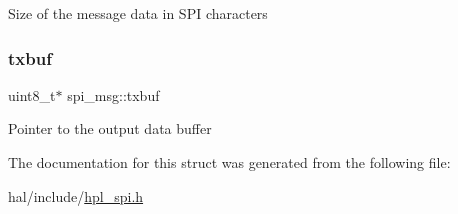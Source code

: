 Size of the message data in S\+PI characters \mbox{\label{structspi__msg_a250cdea72eff03e07bdecad08a62520d}} 
\subsubsection{\texorpdfstring{txbuf}{txbuf}}
{\footnotesize\ttfamily uint8\+\_\+t$\ast$ spi\+\_\+msg\+::txbuf}

Pointer to the output data buffer 

The documentation for this struct was generated from the following file\+:\begin{DoxyCompactItemize}
\item 
hal/include/\hyperlink{hpl__spi_8h}{hpl\+\_\+spi.\+h}\end{DoxyCompactItemize}
